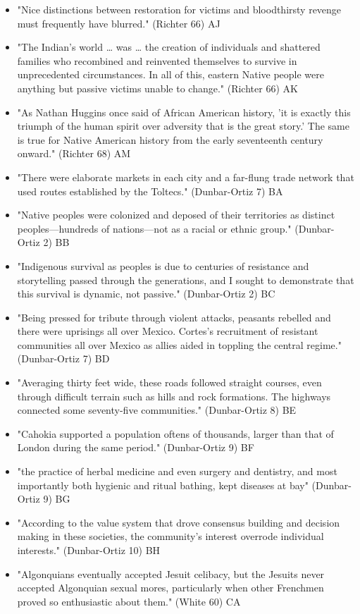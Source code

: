 \documentclass[letterpaper]{article}
\begin{document}
\begin{itemize}
\item "Nice distinctions between restoration for victims and bloodthirsty revenge must frequently have blurred." (Richter 66) AJ
\item "The Indian's world \ldots{} was \ldots{} the creation of individuals and shattered families who recombined and reinvented themselves to survive in unprecedented circumstances. In all of this, eastern Native people were anything but passive victims unable to change." (Richter 66) AK
\item "As Nathan Huggins once said of African American history, 'it is exactly this triumph of the human spirit over adversity that is the great story.' The same is true for Native American history from the early seventeenth century onward." (Richter 68) AM
\item "There were elaborate markets in each city and a far-flung trade network that used routes established by the Toltecs." (Dunbar-Ortiz 7) BA
\item "Native peoples were colonized and deposed of their territories as distinct peoples—hundreds of nations—not as a racial or ethnic group." (Dunbar-Ortiz 2) BB
\item "Indigenous survival as peoples is due to centuries of resistance and storytelling passed through the generations, and I sought to demonstrate that this survival is dynamic, not passive." (Dunbar-Ortiz 2) BC
\item "Being pressed for tribute through violent attacks, peasants rebelled and there were uprisings all over Mexico. Cortes’s recruitment of resistant communities all over Mexico as allies aided in toppling the central regime." (Dunbar-Ortiz 7) BD
\item "Averaging thirty feet wide, these roads followed straight courses, even through difficult terrain such as hills and rock formations. The highways connected some seventy-five communities." (Dunbar-Ortiz 8) BE
\item "Cahokia supported a population oftens of thousands, larger than that of London during the same period." (Dunbar-Ortiz 9) BF
\item "the practice of herbal medicine and even surgery and dentistry, and most importantly both hygienic and ritual bathing, kept diseases at bay" (Dunbar-Ortiz 9) BG
\item "According to the value system that drove consensus building and decision making in these societies, the community’s interest overrode individual interests." (Dunbar-Ortiz 10) BH
\item "Algonquians eventually accepted Jesuit celibacy, but the Jesuits never accepted Algonquian sexual mores, particularly when other Frenchmen proved so enthusiastic about them." (White 60) CA

\end{itemize}
\end{document}

